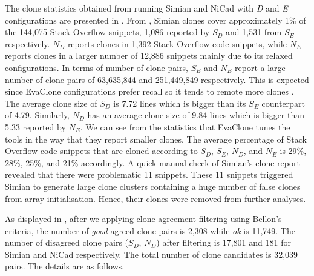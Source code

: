 \documentclass{sig-alternate-05-2015}
\begin{document}
The clone statistics obtained from running Simian and NiCad with \textit{D} and \textit{E} configurations are presented in . From , Simian clones cover approximately 1\% of the 144,075 Stack Overflow snippets, 1,086 reported by $S_D$ and 1,531 from $S_E$ respectively. $N_D$ reports clones in 1,392 Stack Overflow code snippets, while $N_E$ reports clones in a larger number of 12,886 snippets  mainly due to its relaxed configurations. In terms of number of clone pairs, $S_E$ and $N_E$ report a large number of clone pairs of 63,635,844 and 251,449,849 respectively. This is expected since EvaClone configurations prefer recall so it tends to remote more clones \cite{Wang2013}. The average clone size of $S_D$ is 7.72 lines which is bigger than its $S_E$ counterpart of 4.79. Similarly, $N_D$ has an average clone size of 9.84 lines which is bigger than 5.33 reported by $N_E$. We can see from the statistics that EvaClone tunes the tools in the way that they report smaller clones. The average percentage of Stack Overflow code snippets that are cloned according to $S_D$, $S_E$, $N_D$, and $N_E$ is 29\%, 28\%, 25\%, and 21\% accordingly. A quick manual check of Simian's clone report revealed that there were problematic 11 snippets. These 11 snippets triggered Simian to generate large clone clusters containing a huge number of false clones from array initialisation. Hence, their clones were removed from further analyses. 

As displayed in , after we applying clone agreement filtering using Bellon's criteria, the number of \textit{good} agreed clone pairs is 2,308 while \textit{ok} is 11,749. The number of disagreed clone pairs ($S_D$, $N_D$) after filtering is 17,801 and 181 for Simian and NiCad respectively. The total number of clone candidates is 32,039 pairs. The details are as follows.
\end{document}
